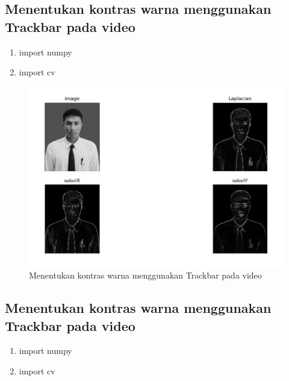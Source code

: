 \newpage
\subsection{Menentukan kontras warna menggunakan Trackbar pada video}

\begin{enumerate}
	\item import numpy
	\item import cv
\end{enumerate}

\newpage
\begin{figure}[ht]
\centering
\includegraphics[scale=0.5]{figures/2,67.jpg}
\caption{Menentukan kontras warna menggunakan Trackbar pada video}
\label{contoh}
\end{figure}







\newpage
\subsection{Menentukan kontras warna menggunakan Trackbar pada video}

\begin{enumerate}
	\item import numpy
	\item import cv
\end{enumerate}

